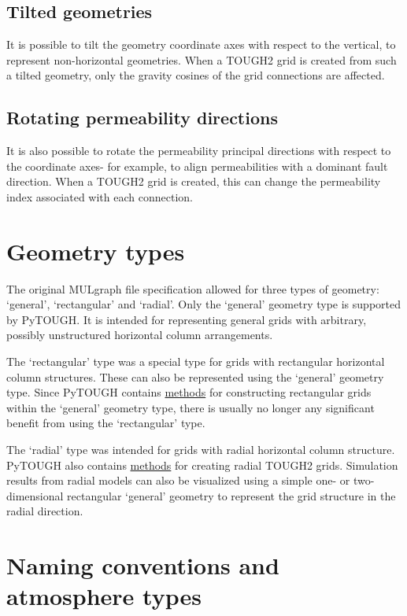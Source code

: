 \subsection{Tilted geometries}
It is possible to tilt the geometry coordinate axes with respect to the vertical, to represent non-horizontal geometries. When a TOUGH2 grid is created from such a tilted geometry, only the gravity cosines of the grid connections are affected.

\subsection{Rotating permeability directions}
It is also possible to rotate the permeability principal directions with respect to the coordinate axes- for example, to align permeabilities with a dominant fault direction. When a TOUGH2 grid is created, this can change the permeability index associated with each connection.

\section{Geometry types}
The original MULgraph file specification allowed for three types of geometry: `general', `rectangular' and `radial'. Only the `general' geometry type is supported by PyTOUGH. It is intended for representing general grids with arbitrary, possibly unstructured horizontal column arrangements.

The `rectangular' type was a special type for grids with rectangular horizontal column structures. These can also be represented using the `general' geometry type. Since PyTOUGH contains \hyperref[sec:mulgrid:rectangular]{methods} for constructing rectangular grids within the `general' geometry type, there is usually no longer any significant benefit from using the `rectangular' type.

The `radial' type was intended for grids with radial horizontal column structure. PyTOUGH also contains \hyperref[sec:t2grid:radial]{methods} for creating radial TOUGH2 grids. Simulation results from radial models can also be visualized using a simple one- or two-dimensional rectangular `general' geometry to represent the grid structure in the radial direction.

\section{Naming conventions and atmosphere types}
\label{geometry_format_conventions}

